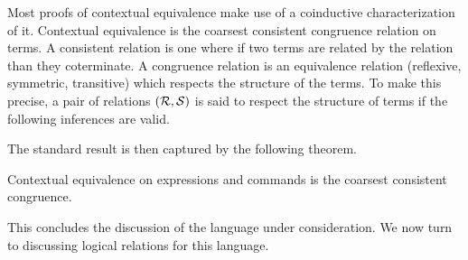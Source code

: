 Most proofs of contextual equivalence make use of a coinductive
characterization of it. Contextual equivalence is the coarsest
consistent congruence relation on terms. A consistent relation is one
where if two terms are related by the relation than they
coterminate. A congruence relation is an equivalence relation
(reflexive, symmetric, transitive) which respects the structure of the
terms. To make this precise, a pair of relations $(\mathrel{\mathcal{R}}, \mathrel{\mathcal{S}})$ is
said to respect the structure of terms if the following inferences are
valid.
The standard result is then captured by the following theorem.
\begin{thm}\label{thm:language:cxt}
  Contextual equivalence on expressions and commands is the coarsest
  consistent congruence.
\end{thm}
This concludes the discussion of the language under consideration. We
now turn to discussing logical relations for this language.

